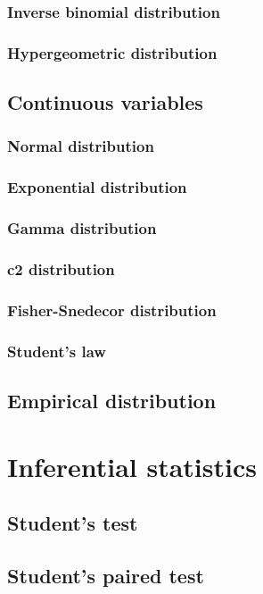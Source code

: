 \documentclass{report}
\begin{document}
		\subsection{Inverse binomial distribution}
		\subsection{Hypergeometric distribution}
	\section{Continuous variables}
		\subsection{Normal distribution}
		\subsection{Exponential distribution}
		\subsection{Gamma distribution}
		\subsection{c2 distribution}
		\subsection{Fisher-Snedecor distribution}
		\subsection{Student’s law}
	\section{Empirical distribution}

\chapter{Inferential statistics}\label{chap:inferential}
	\section{Student’s test}
	\section{Student’s paired test}
\end{document}
